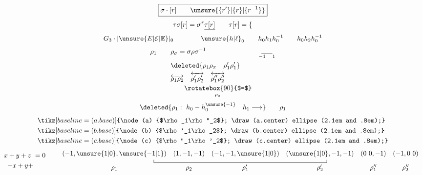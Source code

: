 \[
\boxed{\sigma\cdot[r]\qquad\unsure{\{r'\}|\{r\}|\{r^{-1}\}}}
\]
\[
\tau\sigma[r]=\sigma^\tau\underline{\tau[r]}
\qquad \tau[r]=\left\{\vphantom{\Large A}\right.
\]
\[
G_3\cdot|\unsure{E|\mathcal E|\mathbb E}|_0\qquad\qquad
\unsure{h|\ell}_0\qquad h_0h_1h_0^{-1}\qquad h_0h_2h_0^{-1}
\]
\[
\begin{aligned}
\rho_1\qquad &\rho_\sigma=\sigma\rho\sigma^{-1}
  &&\underset{-1\quad1}{\rule{1.6em}{.4pt}}\\
&\deleted{\rho_1\rho_\pi\quad\rho'_1\rho'_1}\\
&\overleftrightarrow{\rho_1\rho_2}\quad
  \overleftrightarrow{\rho'_1\rho'_2}\quad\overleftrightarrow{\rho''_1\rho''_2}
  &&\\[-1pt]
&\qquad\underset{\rho_\pi}{\rotatebox{90}{$=$}}
\end{aligned}
\]
\[
\deleted{\rho_1:\ h_0\mathbin{-}h_0^{\unsure{-1}}\quad h_1\longrightarrow}\qquad\rho_1
\]
\[
\begin{aligned}
&\tikz[baseline=(a.base)]{\node (a) {$\rho_1\rho''_2$}; \draw (a.center) ellipse (2.1em and .8em);}\\
&\tikz[baseline=(b.base)]{\node (b) {$\rho'_1\rho_2$}; \draw (b.center) ellipse (2.1em and .8em);}\\
&\tikz[baseline=(c.base)]{\node (c) {$\rho''_1\rho'_2$}; \draw (c.center) ellipse (2.1em and .8em);}
\end{aligned}
\]
\[
\begin{aligned}
x+y+z\ &=0\\
-x+y+&
\end{aligned}
\qquad
\begin{array}{cccccc}
(-1,\unsure{1|0},\unsure{-1|1})&(1,-1,-1)&(-1,-1,\unsure{1|0})&
(\unsure{1|0},-1,-1)&(0\ 0,-1)&(-1,0\ 0)\\[-1pt]
\multicolumn{6}{c}{\rule{.4pt}{.45em}\rule{.75\linewidth}{.4pt}\rule{.4pt}{.45em}}\\[-2pt]
\rho_1&\rho_2&\rho'_1&\rho'_2&\rho''_1&\rho''_2
\end{array}
\]
